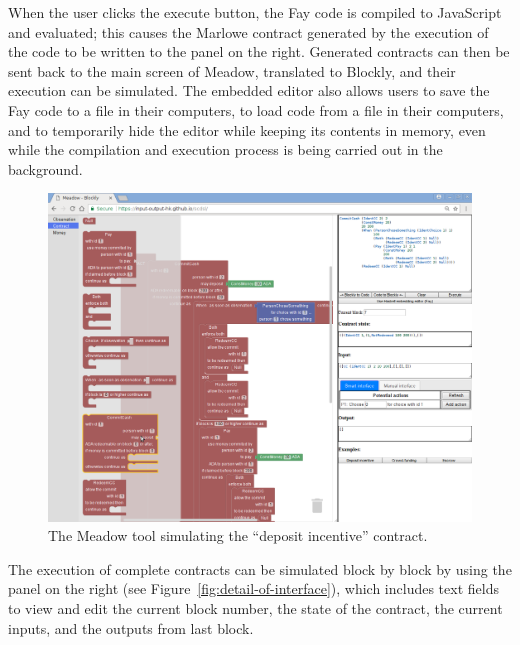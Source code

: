 \documentclass[runningheads]{llncs}
\begin{document}
When the user clicks the execute button, the Fay code is compiled to JavaScript and evaluated; this causes the Marlowe 
contract generated by the execution of the code to be written to the panel on the right. Generated contracts can then be 
sent back to the main screen of Meadow, translated to Blockly, and their execution can be simulated. The embedded editor 
also allows users to save the Fay code to a file in their computers, to load code from a file in their computers, and to 
temporarily hide the editor while keeping its contents in memory, even while the compilation and execution process is 
being carried out in the background.

\begin{figure}[t]
\begin{centering}
\includegraphics[width=1.1\textwidth]{pix/screenshot1}
\par\end{centering}
\caption{\label{fig:full-screenshot-demo}The Meadow tool
simulating the ``deposit incentive'' contract.}
\vspace*{-6mm}
\end{figure}


The execution of complete contracts can be simulated block by block
by using the panel on the right (see Figure~\ref{fig:detail-of-interface}),
which includes text fields to view and edit the current block number,
the state of the contract, the current inputs, and the outputs from
last block.
\end{document}
